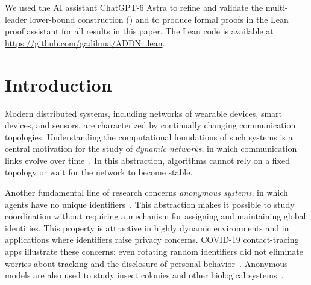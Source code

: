 \documentclass[11pt]{article}
\begin{document}
\begin{titlepage}
\begin{abstract}
\end{abstract}

\vfill

 We used the AI assistant ChatGPT-6 Astra to refine and validate the multi-leader
lower-bound construction ()
and to produce formal proofs in the Lean proof assistant for all
results in this paper. The Lean code is available at
\url{https://github.com/gadiluna/ADDN_lean}.

\end{titlepage}

\pagestyle{empty}
\tableofcontents
\clearpage
\pagestyle{plain}
\setcounter{page}{1}
\hypersetup{pageanchor=true}

\section{Introduction}
Modern distributed systems, including networks of wearable devices, smart devices, and sensors, are characterized by continually changing communication topologies. 
 Understanding the computational foundations of such systems is a central motivation for the
study of \emph{dynamic networks}, in which communication links evolve over
time~\cite{KLO10,CFQS12,APR16}. In this abstraction, algorithms cannot rely on a fixed topology or
wait for the network to become stable.

Another fundamental line of research concerns \emph{anonymous systems}, in
which agents have no unique identifiers~\cite{Angluin80,MCS13}. This abstraction makes it possible to study
coordination without requiring a mechanism for assigning and maintaining
global identities. This property is attractive in highly dynamic environments
and in applications where identifiers raise privacy concerns.
COVID-19 contact-tracing apps illustrate these concerns: even rotating random
identifiers did not eliminate worries about tracking and the disclosure of
personal behavior~\cite{SB20,BaumgartnerEtAl20}.
Anonymous models are also used to study insect colonies and other biological
systems~\cite{GMRL15}.
\end{document}
